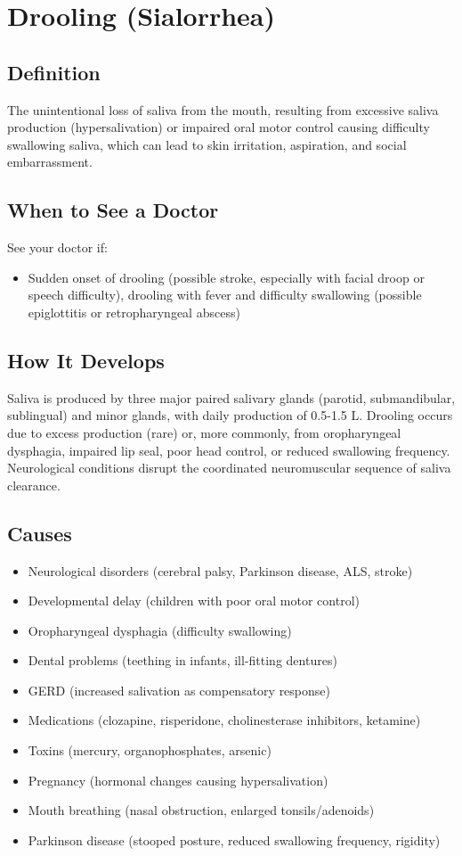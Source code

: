 \chapter{Drooling (Sialorrhea)}

\section*{Definition}
The unintentional loss of saliva from the mouth, resulting from excessive saliva production (hypersalivation) or impaired oral motor control causing difficulty swallowing saliva, which can lead to skin irritation, aspiration, and social embarrassment.

\section*{When to See a Doctor}
See your doctor if:
\begin{itemize}
  \item Sudden onset of drooling (possible stroke, especially with facial droop or speech difficulty), drooling with fever and difficulty swallowing (possible epiglottitis or retropharyngeal abscess)
\end{itemize}

\section*{How It Develops}
Saliva is produced by three major paired salivary glands (parotid, submandibular, sublingual) and minor glands, with daily production of 0.5-1.5 L. Drooling occurs due to excess production (rare) or, more commonly, from oropharyngeal dysphagia, impaired lip seal, poor head control, or reduced swallowing frequency. Neurological conditions disrupt the coordinated neuromuscular sequence of saliva clearance.

\section*{Causes}
\begin{itemize}
  \item Neurological disorders (cerebral palsy, Parkinson disease, ALS, stroke)
  \item Developmental delay (children with poor oral motor control)
  \item Oropharyngeal dysphagia (difficulty swallowing)
  \item Dental problems (teething in infants, ill-fitting dentures)
  \item GERD (increased salivation as compensatory response)
  \item Medications (clozapine, risperidone, cholinesterase inhibitors, ketamine)
  \item Toxins (mercury, organophosphates, arsenic)
  \item Pregnancy (hormonal changes causing hypersalivation)
  \item Mouth breathing (nasal obstruction, enlarged tonsils/adenoids)
  \item Parkinson disease (stooped posture, reduced swallowing frequency, rigidity)
\end{itemize}

